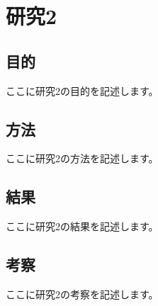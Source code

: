 \section{研究2}

\subsection{目的}
ここに研究2の目的を記述します。

\subsection{方法}
ここに研究2の方法を記述します。

\subsection{結果}
ここに研究2の結果を記述します。

\subsection{考察}
ここに研究2の考察を記述します。 